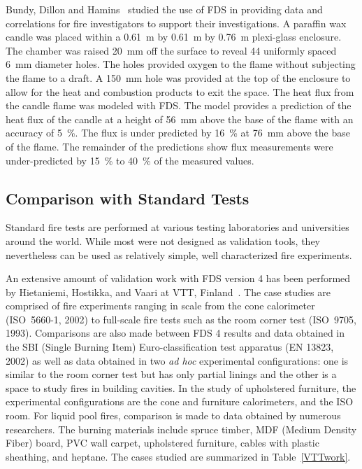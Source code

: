 Bundy,  Dillon and  Hamins~\cite{Dillon:1,Hamins:FPE2005}  studied the use of FDS  in providing data and correlations  for fire investigators to
support their investigations.   A paraffin  wax candle  was placed within  a  0.61~m by  0.61~m  by  0.76~m  plexi-glass enclosure.   The chamber was
raised 20~mm off the surface to reveal 44 uniformly spaced 6~mm diameter holes.   The holes provided oxygen to  the flame without subjecting the
flame to a draft.   A 150~mm hole was  provided at the top of the enclosure to allow  for the heat and combustion products to exit the space.  The
heat flux  from the candle flame was modeled with FDS.  The model  provides a prediction of the heat  flux of the candle at a height of  56~mm above
the base of the flame  with an accuracy of 5~\%. The flux is under predicted  by 16~\% at 76~mm above the base of the  flame. The remainder  of the
predictions show  flux measurements were under-predicted by 15~\% to 40~\% of the measured values.



\subsection{Comparison with Standard Tests}

Standard fire tests are  performed at various testing laboratories and universities  around  the world.   While  most  were  not designed  as
validation tools, they nevertheless  can be used as relatively simple, well characterized fire experiments.

An extensive  amount of  validation work with  FDS version 4  has been performed    by   Hietaniemi,    Hostikka,   and    Vaari    at   VTT,
Finland~\cite{Hietaniemi:1}.  The  case studies are  comprised of fire experiments ranging  in scale  from the cone  calorimeter (ISO~5660-1, 2002)
to full-scale fire tests such as the room corner test (ISO~9705, 1993).  Comparisons are  also  made  between FDS  4  results and  data obtained  in
the  SBI (Single  Burning Item)  Euro-classification test apparatus (EN  13823, 2002) as  well as data  obtained in two  {\em ad hoc} experimental
configurations: one is  similar to the  room corner test but  has only partial linings and  the other is a  space to study fires in building
cavities. In the study of upholstered furniture, the experimental configurations  are the cone  and furniture calorimeters, and the  ISO room. For
liquid  pool fires, comparison is  made to data obtained  by  numerous  researchers.   The burning  materials  include spruce  timber, MDF  (Medium
Density  Fiber) board,  PVC  wall carpet, upholstered furniture, cables with plastic sheathing, and heptane. The cases studied are summarized in
Table~\ref{VTTwork}.

